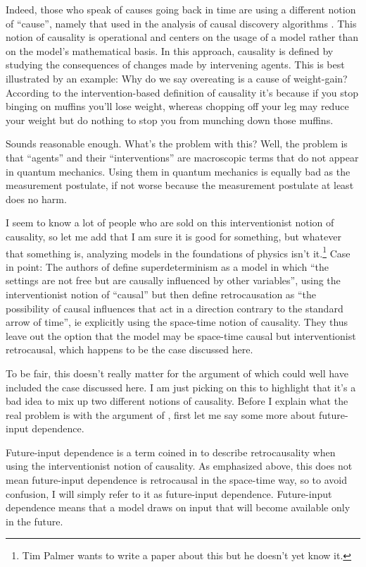 \documentclass[12pt,A4]{article}
\begin{document}
Indeed, those who speak of causes going back in time are using a different notion of ``cause'', namely that used
in the analysis of causal discovery algorithms \cite{Pearl,Spirtes}. This notion of causality is operational and centers
on the usage of a model rather than on the model's mathematical basis. In this approach, causality is defined 
by studying the consequences of changes made by intervening agents.  This is best illustrated by an example: Why
do we say overeating is a cause of weight-gain? According to the intervention-based definition of causality
it's because if you stop binging on muffins you'll lose weight, whereas chopping
off your leg may reduce your weight but do nothing to stop you from munching down those muffins. 

Sounds reasonable enough. What's the problem with this? Well, the problem is that
``agents'' and their ``interventions'' are macroscopic terms that do not appear in quantum mechanics. 
Using them in quantum mechanics is equally bad as the measurement postulate, if not worse because the measurement postulate
at least does no harm. 

I seem to know a lot of people who are sold on this interventionist notion of causality, so let me add that I am
sure it is good for something, but whatever that something is, analyzing models in the foundations
of physics isn't it.\footnote{Tim Palmer wants to write a paper about this but he doesn't yet know it.} Case in
point: The authors of \cite{WoodFinetuning} define superdeterminism as a model in which ``the settings are not free but are
causally influenced by other variables'', using the interventionist notion of ``causal'' but then define retrocausation as
``the possibility of causal influences that act in a direction contrary to the standard arrow
of time'', ie explicitly using the space-time notion of causality. They thus leave out the option that the model may
be space-time causal but interventionist retrocausal, which happens to be the case discussed here. 

To be fair, this doesn't really matter for the argument of \cite{WoodFinetuning} which could well have included the
case discussed here. I am just picking on this to highlight that it's a bad idea to mix up two different
notions of causality. Before I explain what the real problem is with the argument of \cite{WoodFinetuning}, 
first let me say some more about future-input dependence. 

Future-input dependence is a term coined in \cite{Wharton} to describe retrocausality when using the interventionist notion
of causality. As emphasized above, this does not mean future-input dependence is retrocausal in the space-time way, so to avoid confusion,
I will simply refer to it as future-input dependence. Future-input dependence means that a model draws on 
input that will become available only in the future. 
\end{document}
